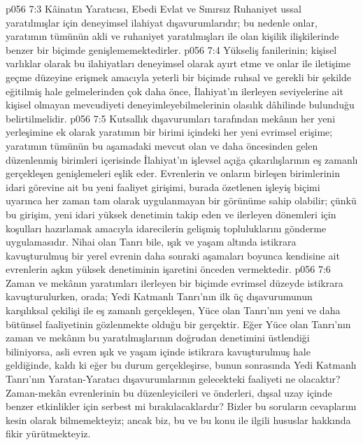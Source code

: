 \vs p056 7:3 Kâinatın Yaratıcısı, Ebedi Evlat ve Sınırsız Ruhaniyet ussal yaratılmışlar için deneyimsel ilahiyat dışavurumlarıdır; bu nedenle onlar, yaratımın tümünün akli ve ruhaniyet yaratılmışları ile olan kişilik ilişkilerinde benzer bir biçimde genişlememektedirler.
\vs p056 7:4 Yükseliş fanilerinin; kişisel varlıklar olarak bu ilahiyatları deneyimsel olarak ayırt etme ve onlar ile iletişime geçme düzeyine erişmek amacıyla yeterli bir biçimde ruhsal ve gerekli bir şekilde eğitilmiş hale gelmelerinden çok daha önce, İlahiyat’ın ilerleyen seviyelerine ait kişisel olmayan mevcudiyeti deneyimleyebilmelerinin olasılık dâhilinde bulunduğu belirtilmelidir.
\vs p056 7:5 Kutsallık dışavurumları tarafından mekânın her yeni yerleşimine ek olarak yaratımın bir birimi içindeki her yeni evrimsel erişime; yaratımın tümünün bu aşamadaki mevcut olan ve daha öncesinden gelen düzenlenmiş birimleri içerisinde İlahiyat’ın işlevsel açığa çıkarılışlarının eş zamanlı gerçekleşen genişlemeleri eşlik eder. Evrenlerin ve onların birleşen birimlerinin idari görevine ait bu yeni faaliyet girişimi, burada özetlenen işleyiş biçimi uyarınca her zaman tam olarak uygulanmayan bir görünüme sahip olabilir; çünkü bu girişim, yeni idari yüksek denetimin takip eden ve ilerleyen dönemleri için koşulları hazırlamak amacıyla idarecilerin gelişmiş topluluklarını gönderme uygulamasıdır. Nihai olan Tanrı bile, ışık ve yaşam altında istikrara kavuşturulmuş bir yerel evrenin daha sonraki aşamaları boyunca kendisine ait evrenlerin aşkın yüksek denetiminin işaretini önceden vermektedir.
\vs p056 7:6 Zaman ve mekânın yaratımları ilerleyen bir biçimde evrimsel düzeyde istikrara kavuşturulurken, orada; Yedi Katmanlı Tanrı’nın ilk üç dışavurumunun karşılıksal çekilişi ile eş zamanlı gerçekleşen, Yüce olan Tanrı’nın yeni ve daha bütünsel faaliyetinin gözlenmekte olduğu bir gerçektir. Eğer Yüce olan Tanrı’nın zaman ve mekânın bu yaratılmışlarının doğrudan denetimini üstlendiği biliniyorsa, asli evren ışık ve yaşam içinde istikrara kavuşturulmuş hale geldiğinde, kaldı ki eğer bu durum gerçekleşirse, bunun sonrasında Yedi Katmanlı Tanrı’nın Yaratan\hyp{}Yaratıcı dışavurumlarının gelecekteki faaliyeti ne olacaktır? Zaman\hyp{}mekân evrenlerinin bu düzenleyicileri ve önderleri, dışsal uzay içinde benzer etkinlikler için serbest mi bırakılacaklardır? Bizler bu soruların cevaplarını kesin olarak bilmemekteyiz; ancak biz, bu ve bu konu ile ilgili hususlar hakkında fikir yürütmekteyiz.
